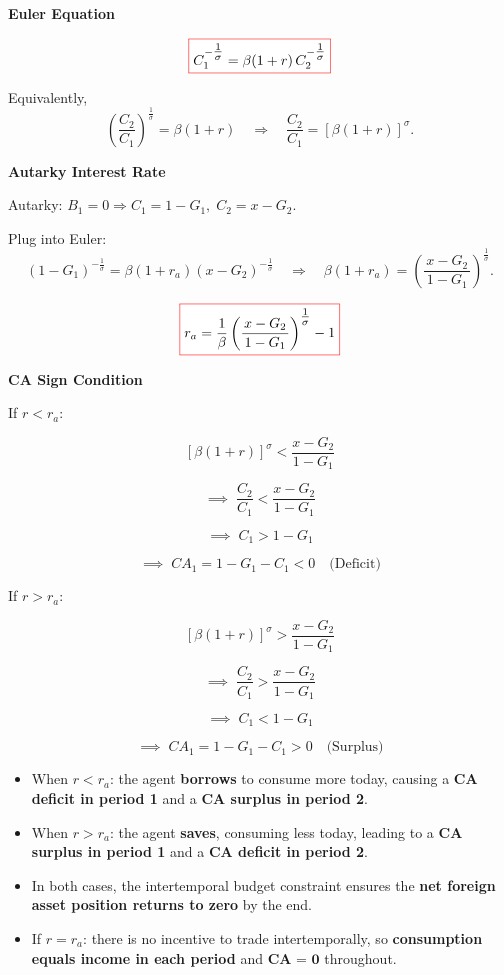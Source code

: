 \documentclass[12pt]{article}
\begin{document}
\textbf{Euler Equation}

\[
\fcolorbox{red}{white}{$
\displaystyle
C_1^{-\tfrac{1}{\sigma}} = \beta(1+r)\, C_2^{-\tfrac{1}{\sigma}}
$}
\]

Equivalently,
\[
\left(\frac{C_2}{C_1}\right)^{\tfrac{1}{\sigma}} = \beta(1+r)
\quad\Rightarrow\quad
\frac{C_2}{C_1} = [\beta(1+r)]^{\sigma}.
\]

\textbf{Autarky Interest Rate}

Autarky: \(B_1=0 \Rightarrow C_1 = 1-G_1,\; C_2 = x-G_2\).

Plug into Euler:
\[
(1-G_1)^{-\tfrac{1}{\sigma}} = \beta(1+r_a)(x-G_2)^{-\tfrac{1}{\sigma}}
\quad\Rightarrow\quad
\beta(1+r_a) = \left(\frac{x-G_2}{\,1-G_1\,}\right)^{\tfrac{1}{\sigma}}.
\]

\[
\fcolorbox{red}{white}{$
\displaystyle
r_a = \frac{1}{\beta}\left(\frac{x-G_2}{\,1-G_1\,}\right)^{\tfrac{1}{\sigma}} - 1
$}
\]

\textbf{CA Sign Condition}

If \( r < r_a \):

\[
[\beta(1+r)]^{\sigma} < \frac{x-G_2}{1-G_1}
\]

\[
\implies \; \frac{C_2}{C_1} < \frac{x-G_2}{1-G_1}
\]

\[
\implies \; C_1 > 1-G_1
\]

\[
\implies \; CA_1 = 1-G_1 - C_1 < 0 \quad \text{(Deficit)}
\]


If \( r > r_a \):

\[
[\beta(1+r)]^{\sigma} > \frac{x-G_2}{1-G_1}
\]

\[
\implies \; \frac{C_2}{C_1} > \frac{x-G_2}{1-G_1}
\]

\[
\implies \; C_1 < 1-G_1
\]

\[
\implies \; CA_1 = 1-G_1 - C_1 > 0 \quad \text{(Surplus)}
\]

\begin{itemize}
    \item When \( r < r_a \): the agent \textbf{borrows} to consume more today, causing a \textbf{CA deficit in period 1} and a \textbf{CA surplus in period 2}.
    
    \item When \( r > r_a \): the agent \textbf{saves}, consuming less today, leading to a \textbf{CA surplus in period 1} and a \textbf{CA deficit in period 2}.
    
    \item In both cases, the intertemporal budget constraint ensures the \textbf{net foreign asset position returns to zero} by the end.
    
    \item If \( r = r_a \): there is no incentive to trade intertemporally, so \textbf{consumption equals income in each period} and \(\textbf{CA = 0}\) throughout.
\end{itemize}
\end{document}
